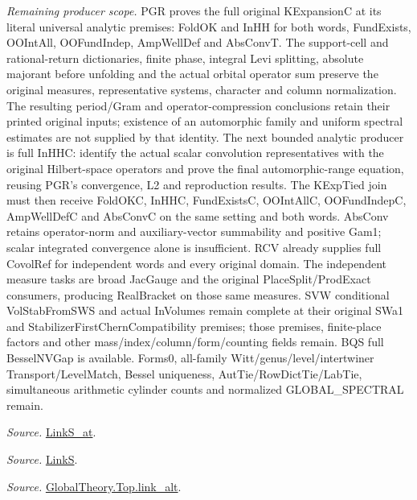 \documentclass[11pt,a4paper]{article}
\numberwithin{equation}{section}
\theoremstyle{remark}\newtheorem{remark}[theorem]{Remark}
\begin{document}
\emph{Remaining producer scope.} PGR proves the full original KExpansionC at its literal universal analytic premises: FoldOK and InHH for both words, FundExists, OOIntAll, OOFundIndep, AmpWellDef and AbsConvT. The support-cell and rational-return dictionaries, finite phase, integral Levi splitting, absolute majorant before unfolding and the actual orbital operator sum preserve the original measures, representative systems, character and column normalization. The resulting period/Gram and operator-compression conclusions retain their printed original inputs; existence of an automorphic family and uniform spectral estimates are not supplied by that identity. The next bounded analytic producer is full InHHC: identify the actual scalar convolution representatives with the original Hilbert-space operators and prove the final automorphic-range equation, reusing PGR's convergence, L2 and reproduction results. The KExpTied join must then receive FoldOKC, InHHC, FundExistsC, OOIntAllC, OOFundIndepC, AmpWellDefC and AbsConvC on the same setting and both words. AbsConv retains operator-norm and auxiliary-vector summability and positive Gam1; scalar integrated convergence alone is insufficient. RCV already supplies full CovolRef for independent words and every original domain. The independent measure tasks are broad JacGauge and the original PlaceSplit/ProdExact consumers, producing RealBracket on those same measures. SVW conditional VolStabFromSWS and actual InVolumes remain complete at their original SWa1 and StabilizerFirstChernCompatibility premises; those premises, finite-place factors and other mass/index/column/form/counting fields remain. BQS full BesselNVGap is available. Forms0, all-family Witt/genus/level/intertwiner Transport/LevelMatch, Bessel uniqueness, AutTie/RowDictTie/LabTie, simultaneous arithmetic cylinder counts and normalized GLOBAL\_\allowbreak SPECTRAL remain.

\emph{Source.} \href{https://github.com/CocoSgt/riemann-hypothesis-lean/blob/7cbf7a0c32fca1badf05931879a37c3f8a2b03b4/src/Formalism/SharpRestriction/GlobalTheoremInputs.lean#L145-L149}{LinkS\_\allowbreak at}.

\emph{Source.} \href{https://github.com/CocoSgt/riemann-hypothesis-lean/blob/7cbf7a0c32fca1badf05931879a37c3f8a2b03b4/src/Formalism/SharpRestriction/GlobalTheoremInputs.lean#L152-L157}{LinkS}.

\emph{Source.} \href{https://github.com/CocoSgt/riemann-hypothesis-lean/blob/7cbf7a0c32fca1badf05931879a37c3f8a2b03b4/src/Development/AbelianVarietyTheory/Proofs/GlobalInterpolation/LinkAlt.lean#L16-L50}{GlobalTheory.Top.link\_\allowbreak alt}.
\end{document}
